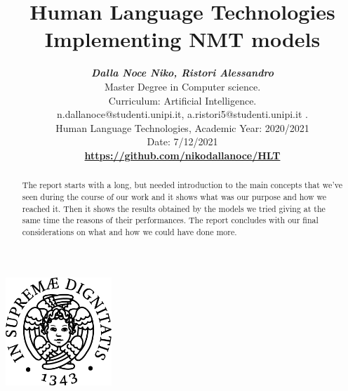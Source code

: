 \documentclass[12pt, letterpaper]{article}  %
\title{\vspace{-2cm}\textbf{Human Language Technologies} \textbf{Implementing NMT models}}
\author{\textbf{\small{\textit{Dalla Noce Niko, Ristori Alessandro}}} \\ %
        \small{Master Degree in Computer science.}\\
        \small{Curriculum: Artificial Intelligence.}\\
        \small{{n.dallanoce@studenti.unipi.it, a.ristori5@studenti.unipi.it }.} \\  %
        \small{Human Language Technologies, Academic Year: 2020/2021} \\
        \small{Date: 7/12/2021} \\
       \textbf{\small{\url{https://github.com/nikodallanoce/HLT}}}
}
\begin{document}
\nocite{*}  %
\date{}
\maketitle
\begin{center}
    \includegraphics[width=0.3\textwidth]{images/unipi.png}\\
    \vspace{0.5cm}
\end{center}
\begin{abstract}
The report starts with a long, but needed introduction to the main concepts that we've seen during the course of our work and it shows what was our purpose and how we reached it. Then it shows the results obtained by the models we tried giving at the same time the reasons of their performances. The report concludes with our final considerations on what and how we could have done more.
\end{abstract}
\newpage
\tableofcontents
\newpage
\listoffigures
\theoremstyle{definition}
\newtheorem{exmp}{Example}[section]






\end{document}
